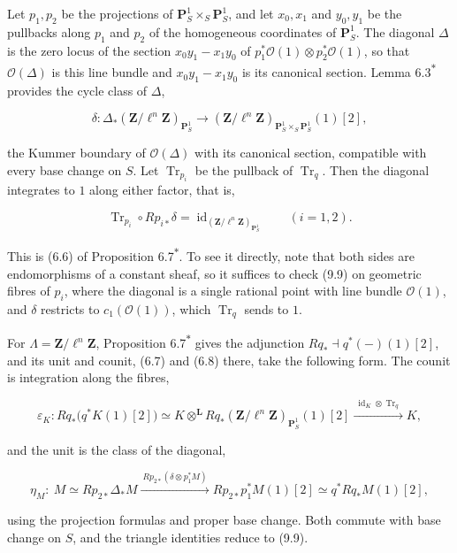 \documentclass[11pt]{article}
\newcommand{\bpout}[1]{#1\textsuperscript{\hyperlink{bp-outside}{\ensuremath{\ast}}}}
\begin{document}
Let \(p_1,p_2\) be the projections of \(\mathbf P^1_S\times_S\mathbf P^1_S\), and let \(x_0,x_1\) and \(y_0,y_1\) be the pullbacks along \(p_1\) and \(p_2\) of the homogeneous coordinates of \(\mathbf P^1_S\). The diagonal \(\Delta\) is the zero locus of the section \(x_0y_1-x_1y_0\) of \(p_1^*\mathcal O(1)\otimes p_2^*\mathcal O(1)\), so that \(\mathcal O(\Delta)\) is this line bundle and \(x_0y_1-x_1y_0\) is its canonical section. Lemma \bpout{6.3} provides the cycle class of \(\Delta\),

\[
\delta:\Delta_*(\mathbf Z/\ell^n\mathbf Z)_{\mathbf P^1_S}
\longrightarrow(\mathbf Z/\ell^n\mathbf Z)_{\mathbf P^1_S\times_S\mathbf P^1_S}(1)[2],
\]

the Kummer boundary of \(\mathcal O(\Delta)\) with its canonical section, compatible with every base change on \(S\). Let \(\operatorname{Tr}_{p_i}\) be the pullback of \(\operatorname{Tr}_q\). Then the diagonal integrates to \(1\) along either factor, that is,

\[
\operatorname{Tr}_{p_i}\circ Rp_{i*}\delta
=\operatorname{id}_{(\mathbf Z/\ell^n\mathbf Z)_{\mathbf P^1_S}}
\qquad(i=1,2).
\tag{9.9}
\]

This is (6.6) of Proposition \bpout{6.7}. To see it directly, note that both sides are endomorphisms of a constant sheaf, so it suffices to check (9.9) on geometric fibres of \(p_i\), where the diagonal is a single rational point with line bundle \(\mathcal O(1)\), and \(\delta\) restricts to \(c_1(\mathcal O(1))\), which \(\operatorname{Tr}_q\) sends to \(1\).

For \(\Lambda=\mathbf Z/\ell^n\mathbf Z\), Proposition \bpout{6.7} gives the adjunction \(Rq_*\dashv q^*(-)(1)[2]\), and its unit and counit, (6.7) and (6.8) there, take the following form. The counit is integration along the fibres,

\[
\varepsilon_K:Rq_*\bigl(q^{*}K(1)[2]\bigr)
\simeq K\otimes^{\mathbf L} Rq_*(\mathbf Z/\ell^n\mathbf Z)_{\mathbf P^1_S}(1)[2]
\xrightarrow{\ \operatorname{id}_K\otimes\operatorname{Tr}_q\ } K,
\tag{9.10}
\]

and the unit is the class of the diagonal,

\[
\eta_M:\ M\simeq Rp_{2*}\Delta_*M
\xrightarrow{\ Rp_{2*}(\delta\otimes p_1^*M)\ } Rp_{2*}p_{1}^{*}M(1)[2]
\simeq q^{*}Rq_*M(1)[2],
\]

using the projection formulas and proper base change. Both commute with base change on \(S\), and the triangle identities reduce to (9.9).
\end{document}
